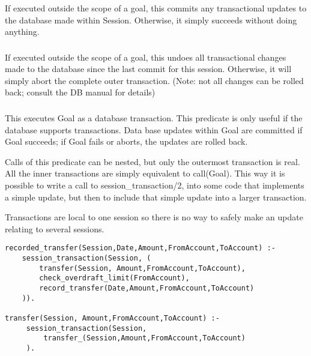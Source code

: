 If executed outside the scope of a
goal, this commits any transactional updates to the database made within
 Session. 
 Otherwise, it simply succeeds without doing anything.

\subsubsection{}
\label{session-rollback/1}

If executed outside the scope of a
goal,
this undoes all transactional changes made to the database since the last
commit for this session. Otherwise, it will simply abort the complete outer
transaction. (Note: not all changes can be rolled back; consult the DB manual for details)

\subsubsection{}
\label{session-transaction/2}

This executes Goal as a database transaction. This predicate is only useful
if the database supports transactions. Data base updates within Goal are
committed if Goal succeeds; if Goal fails or aborts, the updates are rolled
back. 

Calls of this predicate can be nested, but only the outermost
transaction is real. All the inner transactions are simply
equivalent to call(Goal).
This way it is possible to write a call to
session_transaction/2, into some code that implements a simple
update, but then to include that simple update into a larger
transaction.

Transactions are local to one session so there is no way to safely
make an update relating to several sessions.

\begin{verbatim}
recorded_transfer(Session,Date,Amount,FromAccount,ToAccount) :-
    session_transaction(Session, (
        transfer(Session, Amount,FromAccount,ToAccount),
        check_overdraft_limit(FromAccount),
        record_transfer(Date,Amount,FromAccount,ToAccount)
    )).

transfer(Session, Amount,FromAccount,ToAccount) :-
     session_transaction(Session, 
         transfer_(Session,Amount,FromAccount,ToAccount)
     ).

\end{verbatim}

